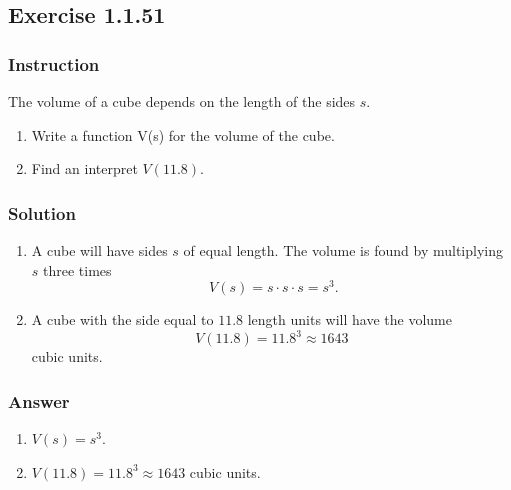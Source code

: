 \subsection*{Exercise 1.1.51}

\subsubsection*{Instruction}

The volume of a cube depends on the length of the sides $ s $.

\begin{enumerate}[label = (\alph*)]
  \item
    Write a function V(s) for the volume of the cube.
  \item
    Find an interpret $ V(11.8) $.
\end{enumerate}

\subsubsection*{Solution}

\begin{enumerate}[label = (\alph*)]
  \item
    A cube will have sides $ s $ of equal length. The volume is found by multiplying $ s $ three times
    $$ \phantom{.}
    V(s) = s \cdot s \cdot s = s^3
    .$$
  \item
    A cube with the side equal to $ 11.8 $ length units will have the volume
    $$
    V(11.8) = 11.8^3 \approx 1643
    $$
    cubic units.
\end{enumerate}

\subsubsection*{Answer}

\begin{enumerate}[label = (\alph*)]
  \item
    $ V(s) = s^3 $.
  \item
    $ V(11.8) = 11.8^3 \approx 1643 $ cubic units.
\end{enumerate}

